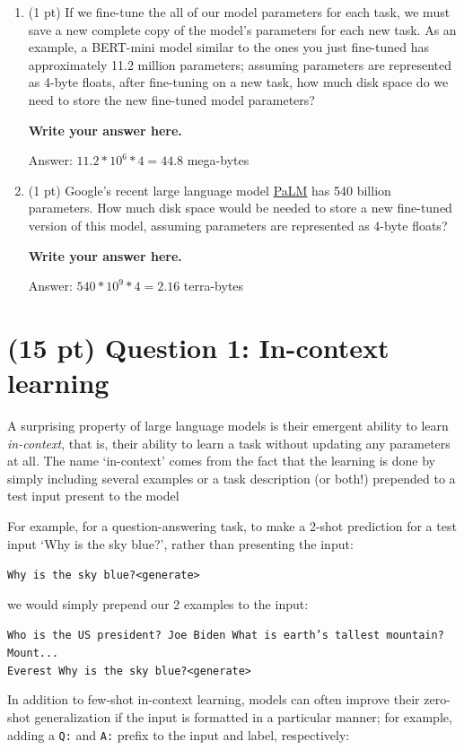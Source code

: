 \documentclass[12pt]{article}
\begin{document}
\begin{enumerate}
    \item (1 pt) If we fine-tune the all of our model parameters for each task, we must save a new complete copy of the model's parameters for each new task. As an example, a BERT-mini model similar to the ones you just fine-tuned has approximately 11.2 million parameters; assuming parameters are represented as 4-byte floats, after fine-tuning on a new task, how much disk space do we need to store the new fine-tuned model parameters?

    \textbf{\color{red} Write your answer here.}

    Answer: $ 11.2 * 10^6 * 4 = 44.8 $ mega-bytes

    \item (1 pt) Google's recent large language model \href{https://storage.googleapis.com/pathways-language-model/PaLM-paper.pdf}{PaLM} has 540 billion parameters. How much disk space would be needed to store a new fine-tuned version of this model, assuming parameters are represented as 4-byte floats?

    \textbf{\color{red} Write your answer here.}

    Answer: $ 540 * 10^9 * 4 = 2.16 $ terra-bytes

\end{enumerate}

\section*{(15 pt) Question 1: In-context learning}
A surprising property of large language models is their emergent ability to learn \textit{in-context}, that is, their ability to learn a task without updating any parameters at all. The name `in-context' comes from the fact that the learning is done by simply including several examples or a task description (or both!) prepended to a test input present to the model

For example, for a question-answering task, to make a 2-shot prediction for a test input `Why is the sky blue?', rather than presenting the input:

\texttt{Why is the sky blue?\textless generate\textgreater}

we would simply prepend our 2 examples to the input:

\texttt{Who is the US president? Joe Biden What is earth's tallest mountain? Mount... \\
Everest Why is the sky blue?\textless generate\textgreater}

In addition to few-shot in-context learning, models can often improve their zero-shot generalization if the input is formatted in a particular manner; for example, adding a \texttt{Q:} and \texttt{A:} prefix to the input and label, respectively:
\end{document}
